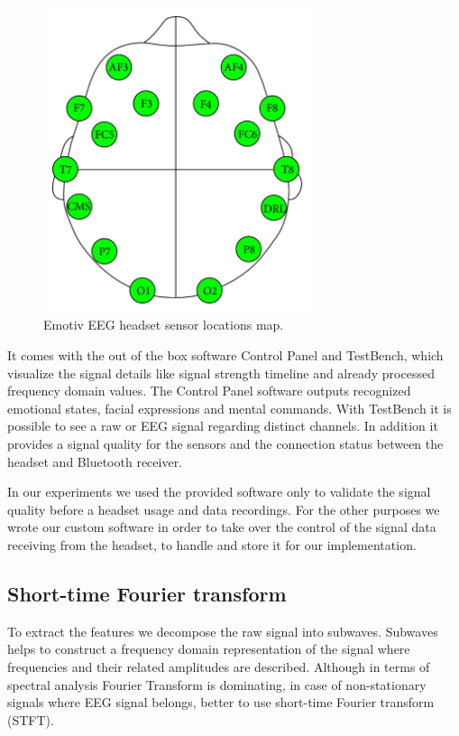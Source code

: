 \documentclass[12pt]{article}
\theoremstyle{definition}
\begin{document}
\begin{figure} [H]
\begin{center}
\includegraphics[width=0.7\textwidth]{emotiv_eeg}
\caption{Emotiv EEG headset sensor locations map. \cite{emotiv_eeg_pic}}
\label{fig:emotiv_eeg}
\end{center}
\end{figure}

It comes with the out of the box software Control Panel and TestBench, which visualize the signal details like signal strength timeline and already processed frequency domain values. The Control Panel software outputs recognized emotional states, facial expressions and mental commands. With TestBench it is possible to see a raw or EEG signal regarding distinct channels. In addition it provides a signal quality for the sensors and the connection status between the headset and Bluetooth receiver.

In our experiments we used the provided software only to validate the signal quality before a headset usage and data recordings. For the other purposes we wrote our custom software in order to take over the control of the signal data receiving from the headset, to handle and store it for our implementation.

\subsection{Short-time Fourier transform}

To extract the features we decompose the raw signal into subwaves. Subwaves helps to construct a frequency domain representation of the signal where frequencies and their related amplitudes are described. Although in terms of spectral analysis Fourier Transform is dominating, in case of non-stationary signals where EEG signal belongs, better to use short-time Fourier transform (STFT). \cite{alfahoum_fft}
\end{document}
